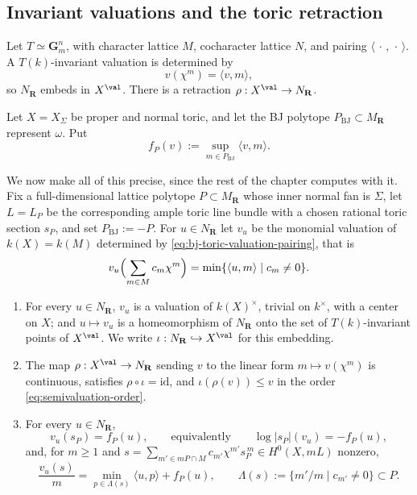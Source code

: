 \subsection{Invariant valuations and the toric retraction}
\label{sec:ch49-toric-setup}

Let $T\simeq\mathbf G_m^n$, with character lattice $M$, cocharacter
lattice $N$, and pairing $\langle\,\cdot\,,\,\cdot\,\rangle$.
A $T(k)$-invariant valuation is determined by
\[
                       v(\chi^m)=\langle v,m\rangle,
\tag{49.18}\label{eq:bj-toric-valuation-pairing}
\]
so $N_{\mathbf R}$ embeds in $X^{\val}$.  There is a retraction
$\rho:X^{\val}\to N_{\mathbf R}$.

Let $X=X_\Sigma$ be proper and normal toric, and let the BJ polytope
$P_{\mathrm{BJ}}\subset M_{\mathbf R}$ represent $\omega$.  Put
\[
 f_P(v):=\sup_{m\in P_{\mathrm{BJ}}}\langle v,m\rangle.
\tag{49.19}\label{eq:bj-toric-support}
\]

We now make all of this precise, since the rest of the chapter computes
with it.  Fix a full-dimensional lattice polytope $P\subset M_{\mathbf R}$
whose inner normal fan is $\Sigma$, let $L=L_P$ be the corresponding
ample toric line bundle with a chosen rational toric section $s_P$, and set
$P_{\mathrm{BJ}}:=-P$.  For $u\in N_{\mathbf R}$ let $v_u$ be the
monomial valuation of $k(X)=k(M)$ determined by
\eqref{eq:bj-toric-valuation-pairing}, that is
\[
 v_u\Bigl(\sum_{m\in M}c_m\chi^m\Bigr)
 =\min\{\langle u,m\rangle\mid c_m\ne0\}.
\]

\begin{lemma}
\label{lem:ch49-toric-slice}
\begin{enumerate}
\item\label{itm:ch49-ts:val}
      For every $u\in N_{\mathbf R}$, $v_u$ is a valuation of
      $k(X)^\times$, trivial on $k^\times$, with a center on $X$; and
      $u\mapsto v_u$ is a homeomorphism of $N_{\mathbf R}$ onto the set
      of $T(k)$-invariant points of $X^{\val}$.  We write
      $\iota:N_{\mathbf R}\hookrightarrow X^{\val}$ for this embedding.
\item\label{itm:ch49-ts:retraction}
      The map $\rho:X^{\val}\to N_{\mathbf R}$ sending $v$ to the
      linear form $m\mapsto v(\chi^m)$ is continuous, satisfies
      $\rho\circ\iota=\mathrm{id}$, and
      $\iota(\rho(v))\le v$ in the order \eqref{eq:semivaluation-order}.
\item\label{itm:ch49-ts:section}
      For every $u\in N_{\mathbf R}$,
      \[
       v_u(s_P)=f_P(u),
       \qquad\text{equivalently}\qquad
       \log|s_P|(v_u)=-f_P(u),
      \tag{49.20}\label{eq:ch49-toric-section}
      \]
      and, for $m\ge1$ and
      $s=\sum_{m'\in mP\cap M}c_{m'}\chi^{m'}s_P^{\,m}\in H^0(X,mL)$
      nonzero,
      \[
       \frac{v_u(s)}{m}
       =\min_{p\in\Lambda(s)}\langle u,p\rangle+f_P(u),
       \qquad
       \Lambda(s):=\{m'/m\mid c_{m'}\ne0\}\subset P .
      \tag{49.21}\label{eq:ch49-toric-section-value}
      \]
\end{enumerate}
\end{lemma}

